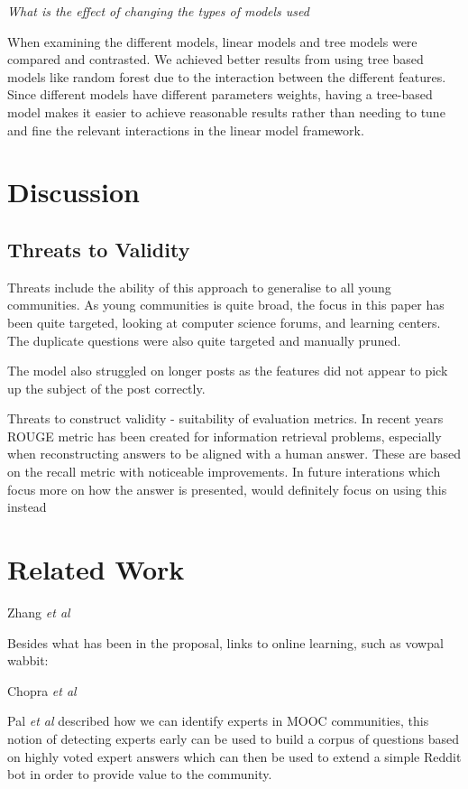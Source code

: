 \documentclass[journal]{IEEEtran}
\begin{document}
\emph{What is the effect of changing the types of models used}

When examining the different models, linear models and tree models were compared and contrasted. We achieved better results from using tree based models like random forest due to the interaction between the different features. Since different models have different parameters weights, having a tree-based model makes it easier to achieve reasonable results rather than needing to tune and fine the relevant interactions in the linear model framework. 

\section{Discussion}

\subsection{Threats to Validity}

Threats include the ability of this approach to generalise to all young communities. As young communities is quite broad, the focus in this paper has been quite targeted, looking at computer science forums, and learning centers. The duplicate questions were also quite targeted and manually pruned. 

The model also struggled on longer posts as the features did not appear to pick up the subject of the post correctly. 

Threats to construct validity - suitability of evaluation metrics. In recent years ROUGE metric has been created for information retrieval problems, especially when reconstructing answers to be aligned with a human answer. These are based on the recall metric with noticeable improvements. In future interations which focus more on how the answer is presented, would definitely focus on using this instead

\section{Related Work}

Zhang \emph{et al}\cite{dupred} 

Besides what has been in the proposal, links to online learning, such as vowpal wabbit:

Chopra \emph{et al}\cite{simmatrix}

Pal \emph{et al}\cite{pal} described how we can identify experts in MOOC communities, this notion of detecting experts early can be used to build a corpus of questions based on highly voted expert answers which can then be used to extend a simple Reddit bot in order to provide value to the community. 
\end{document}
